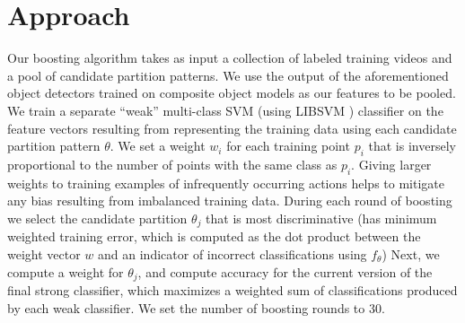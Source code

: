 \documentclass{bmvc2k}
\begin{document}

\section{Approach}

	Our boosting algorithm takes as input a collection of labeled training videos
	and a pool of candidate partition patterns. We use the output of the
  aforementioned object detectors trained on composite object models as our features to be
  pooled.
  We train a separate ``weak''
  multi-class SVM 
  (using LIBSVM \cite{Chang11})
	classifier on the feature vectors resulting from representing the training
	data using each candidate partition pattern $\theta$. We set a weight
  $w_i$ for each
	training point $p_i$ that is inversely proportional to the number of points
	with the same class as $p_i$. Giving larger weights to training examples of
  infrequently occurring actions helps to mitigate any bias resulting from imbalanced
  training data.
  During each round of boosting we select the
	candidate partition $\theta_j$ that is most discriminative (has minimum
  weighted training
	error, which is computed as the dot product between the weight vector $w$
  and an indicator of incorrect classifications using $f_\theta$)
  Next, we compute a weight for $\theta_j$, and compute accuracy for the
	current version of the final strong classifier, which maximizes a weighted
  sum of classifications produced by each weak classifier.
	We set the number of boosting rounds to 30.\\
\end{document}
